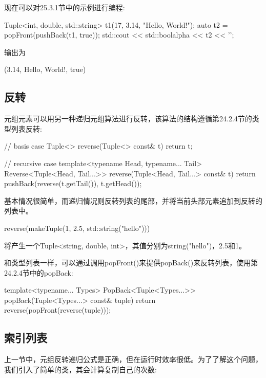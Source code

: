 现在可以对25.3.1节中的示例进行编程:

\begin{cpp}
Tuple<int, double, std::string> t1(17, 3.14, "Hello, World!");
auto t2 = popFront(pushBack(t1, true));
std::cout << std::boolalpha << t2 << ’\n’;
\end{cpp}

输出为

\begin{shell}
(3.14, Hello, World!, true)
\end{shell}

\subsection{反转}

元组元素可以用另一种递归元组算法进行反转，该算法的结构遵循第24.2.4节的类型列表反转:

\begin{cpp}
// basis case
Tuple<> reverse(Tuple<> const& t)
{
	return t;
}

// recursive case
template<typename Head, typename... Tail>
Reverse<Tuple<Head, Tail...>> reverse(Tuple<Head, Tail...> const& t)
{
	return pushBack(reverse(t.getTail()), t.getHead());
}
\end{cpp}

基本情况很简单，而递归情况则反转列表的尾部，并将当前头部元素追加到反转的列表中。

\begin{cpp}
reverse(makeTuple(1, 2.5, std::string("hello")))
\end{cpp}

将产生一个Tuple<string, double, int>，其值分别为string("hello")，2.5和1。

和类型列表一样，可以通过调用popFront()来提供popBack()来反转列表，使用第24.2.4节中的popBack:

\begin{cpp}
template<typename... Types>
PopBack<Tuple<Types...>>
popBack(Tuple<Types...> const& tuple)
{
	return reverse(popFront(reverse(tuple)));
}
\end{cpp}

\subsection{索引列表}

上一节中，元组反转递归公式是正确，但在运行时效率很低。为了了解这个问题，我们引入了简单的类，其会计算复制自己的次数:

